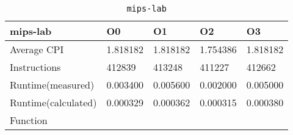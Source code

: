 \begin{table}[ht!]
\centering
\caption{\texttt{mips-lab}}
\label{tab:mips-lab}
\begin{tabular}{|l|l|l|l|l|}
\hline
\textbf{mips-lab}	&	\textbf{O0}	&	\textbf{O1}	&	\textbf{O2}	&	\textbf{O3}	\\\hline\hline
Average CPI	&	1.818182	&	1.818182	&	1.754386	&	1.818182	\\\hline
Instructions	&	412839	&	413248	&	411227	&	412662	\\\hline
Runtime(measured)	&	0.003400	&	0.005600	&	0.002000	&	0.005000	\\\hline
Runtime(calculated)	&	0.000329	&	0.000362	&	0.000315	&	0.000380	\\\hline
Function	&		&		&		&		\\\hline
\end{tabular}
\end{table}
